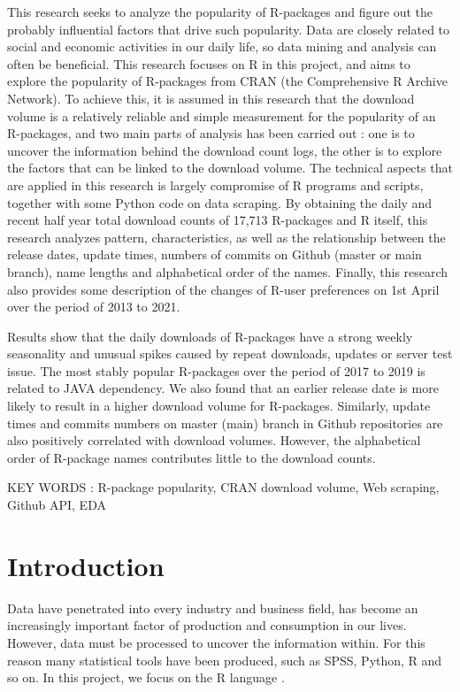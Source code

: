\documentclass[
]{book}
\begin{document}
This research seeks to analyze the popularity of R-packages and figure out the probably influential factors that drive such popularity. Data are closely related to social and economic activities in our daily life, so data mining and analysis can often be beneficial. This research focuses on R in this project, and aims to explore the popularity of R-packages from CRAN (the Comprehensive R Archive Network). To achieve this, it is assumed in this research that the download volume is a relatively reliable and simple measurement for the popularity of an R-packages, and two main parts of analysis has been carried out : one is to uncover the information behind the download count logs, the other is to explore the factors that can be linked to the download volume. The technical aspects that are applied in this research is largely compromise of R programs and scripts, together with some Python code on data scraping. By obtaining the daily and recent half year total download counts of 17,713 R-packages and R itself, this research analyzes pattern, characteristics, as well as the relationship between the release dates, update times, numbers of commits on Github (master or main branch), name lengths and alphabetical order of the names. Finally, this research also provides some description of the changes of R-user preferences on 1st April over the period of 2013 to 2021.

Results show that the daily downloads of R-packages have a strong weekly seasonality and unusual spikes caused by repeat downloads, updates or server test issue. The most stably popular R-packages over the period of 2017 to 2019 is related to JAVA dependency. We also found that an earlier release date is more likely to result in a higher download volume for R-packages. Similarly, update times and commits numbers on master (main) branch in Github repositories are also positively correlated with download volumes. However, the alphabetical order of R-package names contributes little to the download counts.

KEY WORDS : R-package popularity, CRAN download volume, Web scraping, Github API, EDA

\hypertarget{intro}{%
\chapter{Introduction}\label{intro}}

Data have penetrated into every industry and business field, has become an increasingly important factor of production and consumption in our lives. However, data must be processed to uncover the information within. For this reason many statistical tools have been produced, such as SPSS, Python, R and so on. In this project, we focus on the R language \autocite{R-base}.
\end{document}

